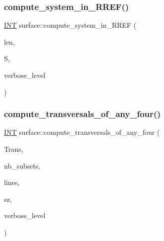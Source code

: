\mbox{\label{classsurface_ac9feb8f85c4de01b183428fdbd874e71}} 
\subsubsection{\texorpdfstring{compute\+\_\+system\+\_\+in\+\_\+\+R\+R\+E\+F()}{compute\_system\_in\_RREF()}}
{\footnotesize\ttfamily \mbox{\hyperlink{galois_8h_a09fddde158a3a20bd2dcadb609de11dc}{I\+NT}} surface\+::compute\+\_\+system\+\_\+in\+\_\+\+R\+R\+EF (\begin{DoxyParamCaption}\item[{\mbox{\hyperlink{galois_8h_a09fddde158a3a20bd2dcadb609de11dc}{I\+NT}}}]{len,  }\item[{\mbox{\hyperlink{galois_8h_a09fddde158a3a20bd2dcadb609de11dc}{I\+NT}} $\ast$}]{S,  }\item[{\mbox{\hyperlink{galois_8h_a09fddde158a3a20bd2dcadb609de11dc}{I\+NT}}}]{verbose\+\_\+level }\end{DoxyParamCaption})}

\mbox{\label{classsurface_a8023ace5ba7640932b77f1d54a792614}} 
\subsubsection{\texorpdfstring{compute\+\_\+transversals\+\_\+of\+\_\+any\+\_\+four()}{compute\_transversals\_of\_any\_four()}}
{\footnotesize\ttfamily \mbox{\hyperlink{galois_8h_a09fddde158a3a20bd2dcadb609de11dc}{I\+NT}} surface\+::compute\+\_\+transversals\+\_\+of\+\_\+any\+\_\+four (\begin{DoxyParamCaption}\item[{\mbox{\hyperlink{galois_8h_a09fddde158a3a20bd2dcadb609de11dc}{I\+NT}} $\ast$\&}]{Trans,  }\item[{\mbox{\hyperlink{galois_8h_a09fddde158a3a20bd2dcadb609de11dc}{I\+NT}} \&}]{nb\+\_\+subsets,  }\item[{\mbox{\hyperlink{galois_8h_a09fddde158a3a20bd2dcadb609de11dc}{I\+NT}} $\ast$}]{lines,  }\item[{\mbox{\hyperlink{galois_8h_a09fddde158a3a20bd2dcadb609de11dc}{I\+NT}}}]{sz,  }\item[{\mbox{\hyperlink{galois_8h_a09fddde158a3a20bd2dcadb609de11dc}{I\+NT}}}]{verbose\+\_\+level }\end{DoxyParamCaption})}

